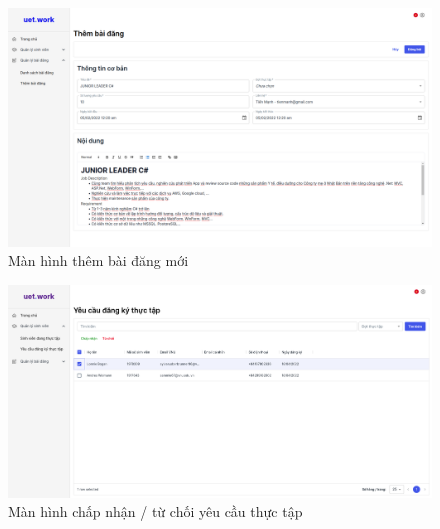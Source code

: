 \documentclass[./../main.tex]{subfiles}
\begin{document}
\begin{figure}[]
	\includegraphics[width=\linewidth]{./images/image18.png}
	\caption{Màn hình thêm bài đăng mới}
	\label{fig:add_post_page}
\end{figure}

\begin{figure}[]
	\includegraphics[width=\linewidth]{./images/image29.png}
	\caption{Màn hình chấp nhận / từ chối yêu cầu thực tập }
	\label{fig:approve_or_reject_request}
\end{figure}
\end{document}
